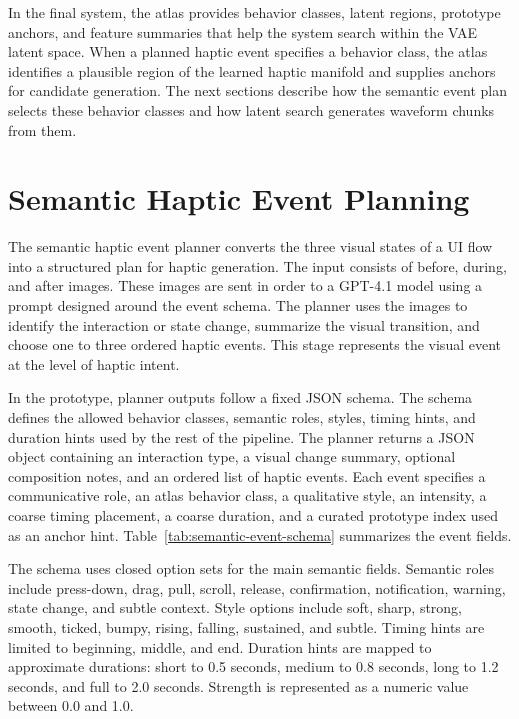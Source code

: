In the final system, the atlas provides behavior classes, latent regions, prototype anchors, and feature summaries that help the system search within the VAE latent space. When a planned haptic event specifies a behavior class, the atlas identifies a plausible region of the learned haptic manifold and supplies anchors for candidate generation. The next sections describe how the semantic event plan selects these behavior classes and how latent search generates waveform chunks from them.

\section{Semantic Haptic Event Planning}

The semantic haptic event planner converts the three visual states of a UI flow into a structured plan for haptic generation. The input consists of before, during, and after images. These images are sent in order to a GPT-4.1 model using a prompt designed around the event schema. The planner uses the images to identify the interaction or state change, summarize the visual transition, and choose one to three ordered haptic events. This stage represents the visual event at the level of haptic intent.

In the prototype, planner outputs follow a fixed JSON schema. The schema defines the allowed behavior classes, semantic roles, styles, timing hints, and duration hints used by the rest of the pipeline. The planner returns a JSON object containing an interaction type, a visual change summary, optional composition notes, and an ordered list of haptic events. Each event specifies a communicative role, an atlas behavior class, a qualitative style, an intensity, a coarse timing placement, a coarse duration, and a curated prototype index used as an anchor hint. Table~\ref{tab:semantic-event-schema} summarizes the event fields.



The schema uses closed option sets for the main semantic fields. Semantic roles include press-down, drag, pull, scroll, release, confirmation, notification, warning, state change, and subtle context. Style options include soft, sharp, strong, smooth, ticked, bumpy, rising, falling, sustained, and subtle. Timing hints are limited to beginning, middle, and end. Duration hints are mapped to approximate durations: short to 0.5 seconds, medium to 0.8 seconds, long to 1.2 seconds, and full to 2.0 seconds. Strength is represented as a numeric value between 0.0 and 1.0.

